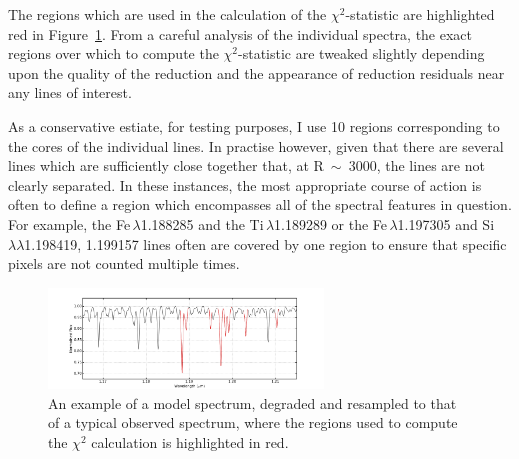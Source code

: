 The regions which are used in the calculation of the $\chi^{2}$-statistic are highlighted red in
Figure~\ref{fig:lines}.
From a careful analysis of the individual spectra, the exact regions over which to compute the $\chi^{2}$-statistic are tweaked slightly depending upon the quality of the reduction and the appearance of reduction residuals near any lines of interest.

As a conservative estiate, for testing purposes, I use 10 regions corresponding to the cores of the individual lines.
In practise however, given that there are several lines which are sufficiently
close together that, at R~$\sim$~3000,
the lines are not clearly separated.
In these instances, the most appropriate course of action is often to define a region which encompasses all of the spectral features in question.
For example, the Fe\,\1$\lambda$1.188285 and the Ti\,\1$\lambda$1.189289
or the Fe\,\1$\lambda$1.197305 and Si\,\1$\lambda\lambda$1.198419, 1.199157 lines often are covered by one region to ensure that specific pixels are not counted multiple times.


\begin{figure}
 \centering
 \includegraphics[width=0.65\textwidth]{JAnal/Diag-lines}
 \caption[Diagnostic lines]{
An example of a model spectrum, degraded and resampled to that of a typical observed spectrum, where the regions used to compute the $\chi^{2}$ calculation is highlighted in red.
\label{fig:lines}
         }
\end{figure}

